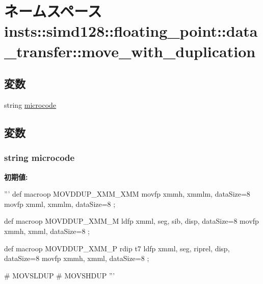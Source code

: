 \hypertarget{namespaceinsts_1_1simd128_1_1floating__point_1_1data__transfer_1_1move__with__duplication}{
\section{ネームスペース insts::simd128::floating\_\-point::data\_\-transfer::move\_\-with\_\-duplication}
\label{namespaceinsts_1_1simd128_1_1floating__point_1_1data__transfer_1_1move__with__duplication}
}
\subsection*{変数}
\begin{DoxyCompactItemize}
\item 
string \hyperlink{namespaceinsts_1_1simd128_1_1floating__point_1_1data__transfer_1_1move__with__duplication_a770f11a173e99389a8802f0107ed8f52}{microcode}
\end{DoxyCompactItemize}


\subsection{変数}
\hypertarget{namespaceinsts_1_1simd128_1_1floating__point_1_1data__transfer_1_1move__with__duplication_a770f11a173e99389a8802f0107ed8f52}{
\subsubsection[{microcode}]{\setlength{\rightskip}{0pt plus 5cm}string {\bf microcode}}}
\label{namespaceinsts_1_1simd128_1_1floating__point_1_1data__transfer_1_1move__with__duplication_a770f11a173e99389a8802f0107ed8f52}
{\bfseries 初期値:}
\begin{DoxyCode}
'''
def macroop MOVDDUP_XMM_XMM {
    movfp xmmh, xmmlm, dataSize=8
    movfp xmml, xmmlm, dataSize=8
};

def macroop MOVDDUP_XMM_M {
    ldfp xmml, seg, sib, disp, dataSize=8
    movfp xmmh, xmml, dataSize=8
};

def macroop MOVDDUP_XMM_P {
    rdip t7
    ldfp xmml, seg, riprel, disp, dataSize=8
    movfp xmmh, xmml, dataSize=8
};

# MOVSLDUP
# MOVSHDUP
'''
\end{DoxyCode}
